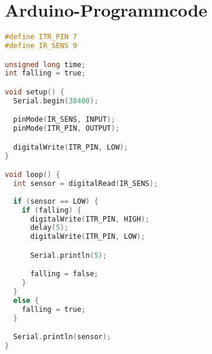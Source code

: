 
\addchap{\appendixPhrase}

\section{Arduino-Programmcode}
\begin{lstlisting}[language=C, label={lst:arduino_selfmade_interrupts}, caption=Programm-Code zur Erstellung des Self-Made Interrupts]
#define ITR_PIN 7
#define IR_SENS 9

unsigned long time;
int falling = true;

void setup() {
  Serial.begin(38400);

  pinMode(IR_SENS, INPUT);
  pinMode(ITR_PIN, OUTPUT);

  digitalWrite(ITR_PIN, LOW);
}

void loop() {
  int sensor = digitalRead(IR_SENS);
  
  if (sensor == LOW) {
    if (falling) {
      digitalWrite(ITR_PIN, HIGH);
      delay(5);
      digitalWrite(ITR_PIN, LOW);

      Serial.println(5);

      falling = false;
    }
  }
  else {
    falling = true;
  }

  Serial.println(sensor);
}
\end{lstlisting}
